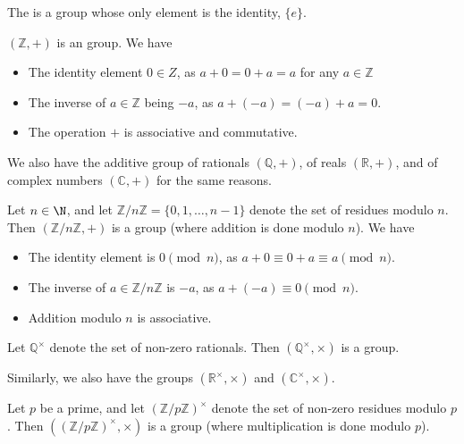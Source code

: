 \documentclass[a4paper]{scrartcl}
\begin{document}
\begin{example}
	The  is a group whose only element is the identity, $\{ e \}$.
\end{example}

\begin{example}
	$(\mathbb{Z}, +)$ is an group. We have
	\begin{itemize}
		\item The identity element $0 \in Z$, as $a + 0 = 0 + a = a$ for any $a \in \mathbb{Z}$
		\item The inverse of $a \in \mathbb{Z}$ being $-a$, as $a + (-a) = (-a) + a = 0$. 
		\item The operation $+$ is associative and commutative.
	\end{itemize}
\end{example}
We also have the additive group of rationals $(\mathbb{Q}, +)$, of reals $(\mathbb{R}, +)$, and of complex numbers $(\mathbb{C}, +)$ for the same reasons.

\begin{example}
	Let $n \in \N$, and let $\mathbb{Z}/n \mathbb{Z} = \{0, 1, \dots, n - 1\}$ denote the set of residues modulo $n$. Then $(\mathbb{Z}/n\mathbb{Z}, +)$ is a group (where addition is done modulo $n$). We have
	\begin{itemize}
		\item The identity element is $0 \pmod{n}$, as $a + 0 \equiv 0 + a \equiv a \pmod{n}$.
		\item The inverse of $a \in \mathbb{Z}/n\mathbb{Z}$ is $-a$, as $a + (-a) \equiv 0 \pmod{n}$.
		\item Addition modulo $n$ is associative.
	\end{itemize}
\end{example}

\begin{example}
	Let $\mathbb{Q}^\times$ denote the set of non-zero rationals. Then $(\mathbb{Q}^\times, \times)$ is a group.
\end{example}
Similarly, we also have the groups $(\mathbb{R}^\times, \times)$ and $(\mathbb{C}^\times, \times)$.

\begin{example}
	Let $p$ be a prime, and let $(\mathbb{Z} / p \mathbb{Z})^\times$ denote the set of non-zero residues modulo $p$. Then $((\mathbb{Z} / p \mathbb{Z})^\times, \times)$ is a group (where multiplication is done modulo $p$).
\end{example}
\end{document}
